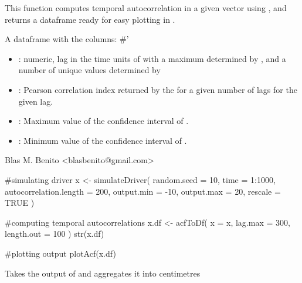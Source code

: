 \documentclass[letterpaper]{book}
\begin{document}
%
\begin{Details}\relax
This function computes temporal autocorrelation in a given vector using , and returns a dataframe ready for easy plotting in .
\end{Details}
%
\begin{Value}
A dataframe with the columns:
\#' \begin{itemize}

\item {}: numeric, lag in the time units of  with a maximum determined by , and a number of unique values determined by 
\item {}: Pearson correlation index returned by the  for a given number of lags for the given lag.
\item {}: Maximum value of the confidence interval of .
\item {}: Minimum value of the confidence interval of .

\end{itemize}

\end{Value}
%
\begin{Author}\relax
Blas M. Benito  <blasbenito@gmail.com>
\end{Author}
%
\begin{SeeAlso}\relax
{}
\end{SeeAlso}
%
\begin{Examples}
\begin{ExampleCode}

#simulating driver
x <- simulateDriver(
  random.seed = 10,
  time = 1:1000,
  autocorrelation.length = 200,
  output.min = -10,
  output.max = 20,
  rescale = TRUE
  )

#computing temporal autocorrelations
x.df <- acfToDf(
  x = x,
  lag.max = 300,
  length.out = 100
  )
str(x.df)

#plotting output
plotAcf(x.df)

\end{ExampleCode}
\end{Examples}
%
\begin{Description}\relax
Takes the output of  and aggregates it into centimetres
\end{Description}
\end{document}
